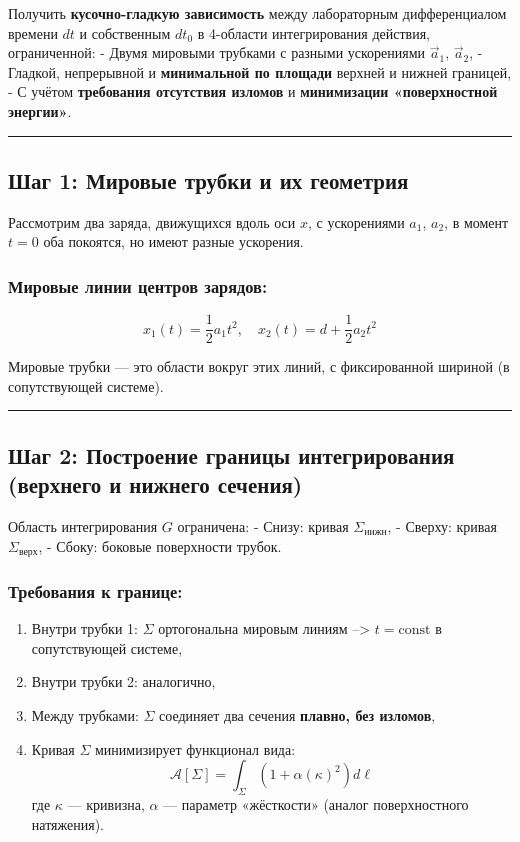 \documentclass[11pt]{article}
\providecommand{\tightlist}{%
      \setlength{\itemsep}{0pt}\setlength{\parskip}{0pt}}
\begin{document}
Получить \textbf{кусочно-гладкую зависимость} между лабораторным
дифференциалом времени \(dt\) и собственным \(dt_0\) в 4-области
интегрирования действия, ограниченной: - Двумя мировыми трубками с
разными ускорениями \(\vec{a}_1\), \(\vec{a}_2\), - Гладкой, непрерывной
и \textbf{минимальной по площади} верхней и нижней границей, - С учётом
\textbf{требования отсутствия изломов} и \textbf{минимизации
«поверхностной энергии»}.

\begin{center}\rule{0.5\linewidth}{\linethickness}\end{center}

\subsection{Шаг 1: Мировые трубки и их геометрия}

Рассмотрим два заряда, движущихся вдоль оси \(x\), с ускорениями
\(a_1\), \(a_2\), в момент \(t = 0\) оба покоятся, но имеют разные
ускорения.

\subsubsection{Мировые линии центров зарядов:}

\[
x_1(t) = \frac{1}{2} a_1 t^2, \quad x_2(t) = d + \frac{1}{2} a_2 t^2
\]

Мировые трубки --- это области вокруг этих линий, с фиксированной
шириной (в сопутствующей системе).

\begin{center}\rule{0.5\linewidth}{\linethickness}\end{center}

\subsection{ Шаг 2: Построение границы интегрирования (верхнего и нижнего сечения)}

Область интегрирования \(G\) ограничена: - Снизу: кривая
\(\Sigma_{\text{нижн}}\), - Сверху: кривая \(\Sigma_{\text{верх}}\), -
Сбоку: боковые поверхности трубок.

\subsubsection{Требования к границе:}

\begin{enumerate}
\def\labelenumi{\arabic{enumi}.}
\tightlist
\item
  Внутри трубки 1: \(\Sigma\) ортогональна мировым линиям -->
  \(t = \text{const}\) в сопутствующей системе,
\item
  Внутри трубки 2: аналогично,
\item
  Между трубками: \(\Sigma\) соединяет два сечения \textbf{плавно, без
  изломов},
\item
  Кривая \(\Sigma\) минимизирует функционал вида: \[
     \mathcal{A}[\Sigma] = \int_\Sigma \left( 1 + \alpha (\kappa)^2 \right) d\ell
     \] где \(\kappa\) --- кривизна, \(\alpha\) --- параметр «жёсткости»
  (аналог поверхностного натяжения).
\end{enumerate}
\end{document}
